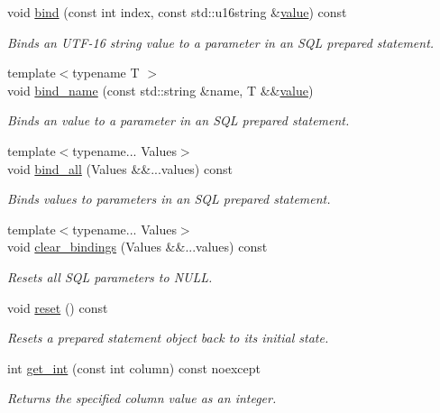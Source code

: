 \begin{DoxyCompactItemize}
void \hyperlink{a00013_a2812922c3fc691f556ed230768b5ca43}{bind} (const int index, const std\-::u16string \&\hyperlink{a00015}{value}) const 
\begin{DoxyCompactList}\small\item\em Binds an U\-T\-F-\/16 string value to a parameter in an S\-Q\-L prepared statement. \end{DoxyCompactList}\item 
{\footnotesize template$<$typename T $>$ }\\void \hyperlink{a00013_a8375bd6c666e395325227048ec0d6065}{bind\-\_\-name} (const std\-::string \&name, T \&\&\hyperlink{a00015}{value})
\begin{DoxyCompactList}\small\item\em Binds an value to a parameter in an S\-Q\-L prepared statement. \end{DoxyCompactList}\item 
{\footnotesize template$<$typename... Values$>$ }\\void \hyperlink{a00013_a15ecbabf7d3a6c8b7005e2a799374785}{bind\-\_\-all} (Values \&\&...values) const 
\begin{DoxyCompactList}\small\item\em Binds values to parameters in an S\-Q\-L prepared statement. \end{DoxyCompactList}\item 
{\footnotesize template$<$typename... Values$>$ }\\void \hyperlink{a00013_aaf51f6d9cf5354200151d81959893a77}{clear\-\_\-bindings} (Values \&\&...values) const 
\begin{DoxyCompactList}\small\item\em Resets all S\-Q\-L parameters to N\-U\-L\-L. \end{DoxyCompactList}\item 
void \hyperlink{a00013_a26af62003da471859ccaf29e45606301}{reset} () const 
\begin{DoxyCompactList}\small\item\em Resets a prepared statement object back to its initial state. \end{DoxyCompactList}\item 
int \hyperlink{a00010_a1c720c80fd5c1f0f618c24a3d09e2ef5}{get\-\_\-int} (const int column) const noexcept
\begin{DoxyCompactList}\small\item\em Returns the specified column value as an integer. \end{DoxyCompactList}\item 

\end{DoxyCompactItemize}
